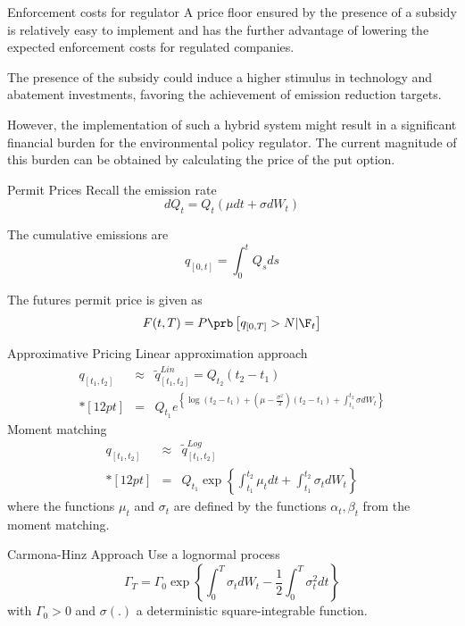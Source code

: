 Enforcement costs for regulator
	A price floor ensured by the presence of a subsidy is relatively easy to implement and has the further advantage of lowering the expected enforcement costs for regulated companies.
  
	The presence of the subsidy could induce a higher stimulus in technology and abatement investments, favoring the achievement of emission reduction targets.
	
	However, the implementation of such a hybrid system might result in a significant financial burden for the environmental policy regulator. The current magnitude of this burden can be obtained by 				
	calculating the price of the put option.



Permit Prices
	Recall the emission rate
		$$
		dQ_t = Q_t(\mu dt + \sigma dW_t)
		$$

	The cumulative emissions are
		$$
		q_{[0,t]} = \int_0^t Q_s ds
		$$

	The futures permit price is given as
		$$
		F(t,T) = P \prb\left[q_{[0,T]}>N |\F_t\right]
		$$


Approximative Pricing
	Linear approximation approach
		$$
		\begin{array}{lll}
		q_{[t_1,t_2]} &\approx& \tilde{q}^{Lin}_{[t_1,t_2]} = Q_{t_2} (t_2 - t_1) \\*[12pt]
		&=&\displaystyle   Q_{t_1} e^{\left\{\log (t_2 - t_1) + \left(\mu-\frac{\sigma^2}{2}\right)(t_2-t_1)+\int_{t_1}^{t_2}\sigma dW_t\right\}}
		\end{array}
		$$
	Moment matching
		$$
		\begin{array}{lll}
		q_{[t_1,t_2]} &\approx& \tilde{q}^{Log}_{[t_1,t_2]}\\*[12pt]
		&=& Q_{t_1} \exp\left\{ \int_{t_1}^{t_2}\mu_t dt + \int_{t_1}^{t_2} \sigma_t dW_t\right\}
		\end{array}
		$$
	where the functions $\mu_t$ and $\sigma_t$ are defined by the functions $\alpha_t, \beta_t$ from the moment matching.



Carmona-Hinz Approach
	Use a lognormal process
		$$
		\Gamma_{T}= \Gamma_0  \exp{\left\{\int_{0}^{T}\sigma_t dW_t -\frac{1}{2}\int_0^T \sigma^2_t dt\right\}}
		$$
	with $\Gamma_0 >0$ and $\sigma(.)$ a deterministic square-integrable function.
	
